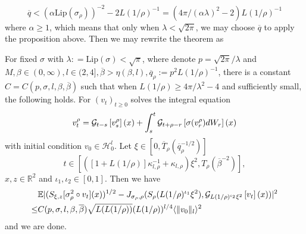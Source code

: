 \[\overline{q} < (\alpha\text{Lip}(\sigma_{\rho}))^{-2} - 2L(1/\rho)^{-1} = (4\pi/(\alpha\lambda)^2 - 2)L(1/\rho)^{-1}\]
where $\alpha \geq 1$, which means that only when $\lambda < \sqrt{2\pi}$, we may choose $\overline{q}$ to apply the proposition above. Then we may rewrite the theorem as
\begin{theorem}
    For fixed $\sigma$ with $\lambda: =\text{Lip}(\sigma) < \sqrt{\pi}$, where denote $p = \sqrt{2\pi}/\lambda$ and $M,\beta \in (0,\infty), l\in (2,4],\overline{\beta} > \eta(\beta,l), \overline{q}_{\rho}:= p^2L(1/\rho)^{-1}$,  there is a constant $C = C(p,\sigma,l,\beta,\overline{\beta})$ such that when $L(1/\rho) \geq 4\pi/\lambda^2 - 4$ and sufficiently small, the following holds. For $(v_t)_{t\geq 0}$ solves the integral equation
    \[
    v_t^{\rho} = \mathcal{G}_{t-s}\left[{v_{s}^{\rho}}\right](x) + \int_s^t \mathcal{G}_{t+\rho-r}\left[{\sigma(v_r^{\rho})dW_r}\right](x)
    \]
    with initial condition $v_0 \in \mathscr{H}_0^l$. Let $\xi\in [0,\overline{T}_{\rho}(\overline{q}_{\rho}^{-1/2})]$ 
    \[t\in [([1+L(1/\rho)]\kappa_{l,\rho}^{-1}+\kappa_{l,\rho})\xi^2,T_{\rho}(\overline{\beta}^{-2})],\] $x,z\in\mathbb{R}^2$ and $\iota_1,\iota_2\in[0,1]$. Then we have
    \[\begin{aligned}
        &\mathbb{E}\lvert(S_{\xi,z}[\sigma_{\rho}^2\circ v_t](x))^{1/2}-J_{\sigma_{\rho},\rho}(S_{\rho}(L(1/\rho)^{\iota_1}\xi^2),\mathcal{G}_{L(1/\rho)^{\iota_2}\xi^2}\left[{v_t}\right](x))\rvert^2 \\\leq &C(p,\sigma,l,\beta,\overline{\beta})\sqrt{L(L(1/\rho))}(L(1/\rho))^{l/4}\langle \lVert v_0\rVert_l\rangle^2 
    \end{aligned}
    \]
    and we are done.
\end{theorem}
